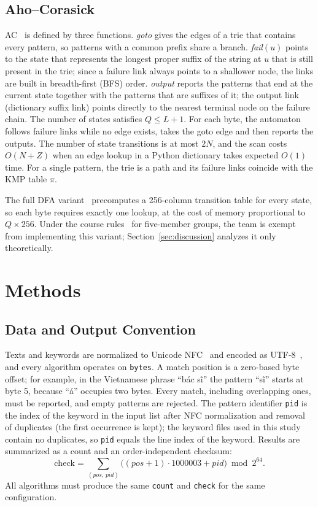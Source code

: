 \documentclass[conference]{IEEEtran}
\begin{document}
\subsection{Aho--Corasick}
AC~\cite{ac} is defined by three functions. \emph{goto} gives the edges of a trie that contains every pattern, so patterns with a common prefix share a branch. \emph{fail}$(u)$ points to the state that represents the longest proper suffix of the string at $u$ that is still present in the trie; since a failure link always points to a shallower node, the links are built in breadth-first (BFS) order. \emph{output} reports the patterns that end at the current state together with the patterns that are suffixes of it; the output link (dictionary suffix link) points directly to the nearest terminal node on the failure chain. The number of states satisfies $Q\le L+1$. For each byte, the automaton follows failure links while no edge exists, takes the goto edge and then reports the outputs. The number of state transitions is at most $2N$, and the scan costs $O(N+Z)$ when an edge lookup in a Python dictionary takes expected $O(1)$ time. For a single pattern, the trie is a path and its failure links coincide with the KMP table $\pi$.

The full DFA variant~\cite{ac} precomputes a 256-column transition table for every state, so each byte requires exactly one lookup, at the cost of memory proportional to $Q\times 256$. Under the course rules~\cite{rules} for five-member groups, the team is exempt from implementing this variant; Section~\ref{sec:discussion} analyzes it only theoretically.

\section{Methods}
\subsection{Data and Output Convention}
Texts and keywords are normalized to Unicode NFC~\cite{uax15} and encoded as UTF-8~\cite{utf8}, and every algorithm operates on \texttt{bytes}. A match position is a zero-based byte offset; for example, in the Vietnamese phrase ``bác sĩ'' the pattern ``sĩ'' starts at byte 5, because ``á'' occupies two bytes. Every match, including overlapping ones, must be reported, and empty patterns are rejected. The pattern identifier \texttt{pid} is the index of the keyword in the input list after NFC normalization and removal of duplicates (the first occurrence is kept); the keyword files used in this study contain no duplicates, so \texttt{pid} equals the line index of the keyword. Results are summarized as a count and an order-independent checksum:
\begin{equation}
\mathrm{check}=\sum_{(pos,\,pid)}\big((pos+1)\cdot 1000003+pid\big)\bmod 2^{64}.
\end{equation}
All algorithms must produce the same \texttt{count} and \texttt{check} for the same configuration.
\end{document}
